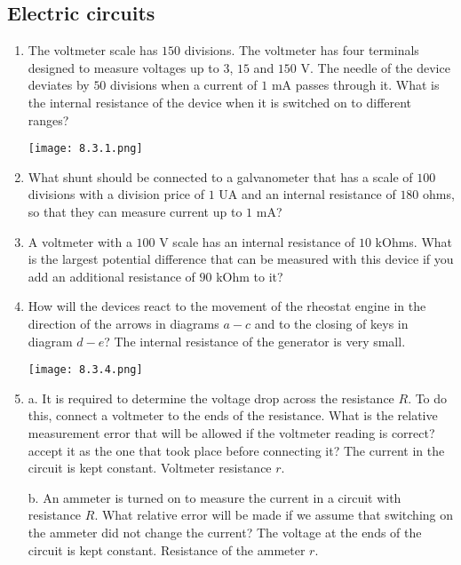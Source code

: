 \documentclass{article}
\begin{document}
\subsection{Electric circuits}

\begin{enumerate}[label=8.3.\arabic*]

\item The voltmeter scale has $150$ divisions. The voltmeter has four terminals designed to measure voltages up to $3$, $15$ and $150$ V. The needle of the device deviates by $50$ divisions when a current of $1$ mA passes through it. What is the internal resistance of the device when it is switched on to different ranges?

\begin{center}
    \texttt{[image: 8.3.1.png]}
\end{center}

\item What shunt should be connected to a galvanometer that has a scale of $100$ divisions with a division price of $1$ UA and an internal resistance of $180$ ohms, so that they can measure current up to $1$ mA?




\item A voltmeter with a $100$ V scale has an internal resistance of $10$ kOhms. What is the largest potential difference that can be measured with this device if you add an additional resistance of $90$ kOhm to it?

\item How will the devices react to the movement of the rheostat engine in the direction of the arrows in diagrams $a-c$ and to the closing of keys in diagram $d-e$? The internal resistance of the generator is very small.

\begin{center}
    \texttt{[image: 8.3.4.png]}
\end{center}


\item a. It is required to determine the voltage drop across the resistance $R$. To do this, connect a voltmeter to the ends of the resistance. What is the relative measurement error that will be allowed if the voltmeter reading is correct? accept it as the one that took place before connecting it? The current in the circuit is kept constant. Voltmeter resistance $r$. 

b. An ammeter is turned on to measure the current in a circuit with resistance $R$. What relative error will be made if we assume that switching on the ammeter did not change the current? The voltage at the ends of the circuit is kept constant. Resistance of the ammeter $r$.




\end{enumerate}
\end{document}
